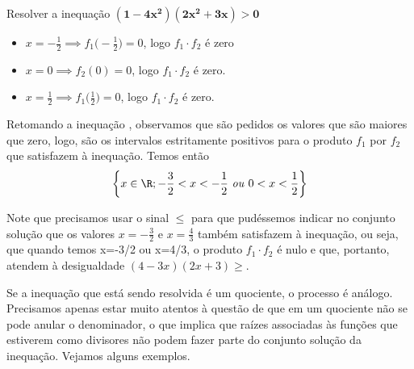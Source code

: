 \begin{example}{Resolver a inequação $\bm{(1-4x^2)(2x^2+3x)>0}$}
\begin{itemize}
\item $x=-\frac{1}{2}\implies f_1\big(-\frac{1}{2}\big)=0$, logo $f_1\cdot f_2$ é zero
\item $x=0\implies f_2(0)=0$, logo $f_1\cdot f_2$ é zero.
\item $x=\frac{1}{2}\implies f_1\big(\frac{1}{2}\big)=0$, logo $f_1\cdot f_2$ é zero.
\end{itemize}

Retomando a inequação , observamos que são pedidos os valores que são maiores que zero, logo, são os intervalos estritamente positivos para o produto $f_1$ por $f_2$  que satisfazem à inequação. Temos então
\begin{equation*}
\left \{
x\in\R; -\frac{3}{2}<x<-\frac{1}{2}\text{ \textit{ou} }0<x<\frac{1}{2}
\right\}
\end{equation*}

\end{example}

\begin{observation}{}
Note que precisamos usar o sinal $\leq$ para que pudéssemos indicar no conjunto solução que os valores $x=-\frac{3}{2}$ e $x=\frac{4}{3}$ também satisfazem à inequação, ou seja, que quando temos x=-3/2 ou x=4/3, o produto $f_1\cdot f_2$ é nulo e que, portanto, atendem à desigualdade $(4-3x)(2x+3)\geq$.
\end{observation}

Se a inequação que está sendo resolvida é um quociente, o processo é análogo. Precisamos apenas estar muito atentos à questão de que em um quociente não se pode anular o denominador, o que implica que raízes associadas às funções que estiverem como divisores não podem fazer parte do conjunto solução da inequação. Vejamos alguns exemplos.

